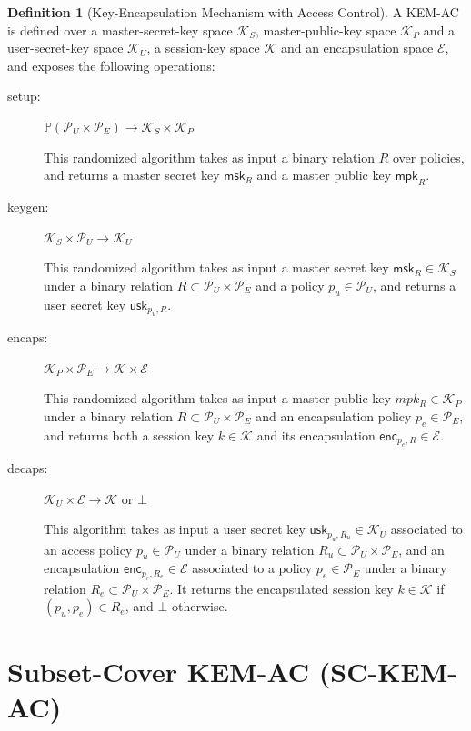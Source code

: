 \documentclass[a4paper]{article}
\theoremstyle{definition}
\newtheorem{definition}{Definition}[section]
\newcommand{\msk}[1]{\mathsf{msk}_{#1}}
\newcommand{\mpk}[1]{\mathsf{mpk}_{#1}}
\newcommand{\usk}[2]{\mathsf{usk}_{#1,#2}}
\newcommand{\enc}[2]{\mathsf{enc}_{#1,#2}}
\newcommand{\powerset}[1]{\mathbb P(#1)}
\newcommand{\cE}{\mathcal{E}}
\newcommand{\cK}{\mathcal{K}}
\newcommand{\cP}{\mathcal{P}}
\begin{document}
\begin{definition}[Key-Encapsulation Mechanism with Access Control]
A KEM-AC  is defined over  a master-secret-key space  \(\cK_S\), master-public-key
space \(\cK_P\) and a user-secret-key space \(\cK_U\), a session-key space \(\cK\) and
an encapsulation space \(\cE\), and exposes the following operations:
\begin{description}
\item[{setup:}] \(\powerset{\cP_U \times \cP_E} \rightarrow \cK_S \times \cK_P\)

This randomized algorithm takes as input  a binary relation \(R\) over policies,
and returns a master secret key \(\msk{R}\) and a master public key \(\mpk{R}\).

\item[{keygen:}] \(\cK_S \times \cP_U \rightarrow \cK_U\)

This randomized  algorithm takes  as input  a master  secret key  \(\msk{R} \in
  \cK_S\) under  a binary relation  \(R \subset \cP_U  \times \cP_E\) and  a policy
\(p_u \in \cP_U\), and returns a user secret key \(\usk{p_u}{R}\).

\item[{encaps:}] \(\cK_P \times \cP_E \rightarrow \cK \times \cE\)

This randomized algorithm takes as input a master public key \(mpk_R \in \cK_P\)
under a  binary relation \(R \subset  \cP_U \times \cP_E\) and  an encapsulation
policy \(p_e  \in \cP_E\), and returns  both a session  key \(k \in \cK\)  and its
encapsulation \(\enc{p_e}{R} \in \cE\).

\item[{decaps:}] \(\cK_U \times \cE \rightarrow \cK\) or \(\bot\)

This algorithm  takes as input  a user  secret key \(\usk{p_u}{R_u}  \in \cK_U\)
associated to  an access policy \(p_u  \in \cP_U\) under a  binary relation \(R_u
  \subset \cP_U  \times \cP_E\),  and an  encapsulation \(\enc{p_e}{R_e}  \in \cE\)
associated to  a policy \(p_e \in  \cP_E\) under a binary  relation \(R_e \subset
  \cP_U \times \cP_E\).   It returns the encapsulated session key  \(k \in \cK\) if
\((p_u,p_e) \in R_e\), and \(\bot\) otherwise.
\end{description}
\label{orgc8dd6ec}
\end{definition}
\section{Subset-Cover KEM-AC (SC-KEM-AC)}
\label{sec:org58fca80}
\end{document}
